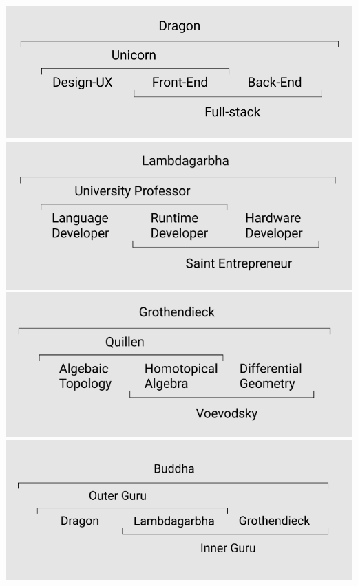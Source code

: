 \documentclass[11pt]{article}
\begin{document}
\includegraphics[scale=0.35]{./dragon.PNG}
\clearpage%
\includegraphics[scale=0.46]{./lambdagarbha.PNG}
\clearpage%
\includegraphics[scale=0.46]{./grothendieck.PNG}
\clearpage%
\includegraphics[scale=0.46]{./buddha.PNG}
\clearpage%
\end{document}
